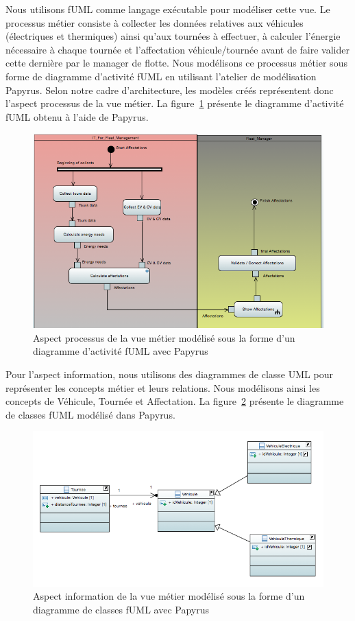 Nous utilisons fUML comme langage
exécutable pour modéliser cette vue. Le processus métier consiste à collecter
les données relatives aux véhicules (électriques et thermiques) ainsi qu'aux
tournées à effectuer, à calculer l'énergie nécessaire à chaque tournée et
l'affectation véhicule/tournée avant de faire valider cette dernière par le
manager de flotte. Nous modélisons ce processus métier sous forme de diagramme
d'activité fUML en utilisant l'atelier de modélisation Papyrus. Selon notre cadre
d'architecture, les modèles créés représentent donc l'aspect processus de la vue
métier. La figure~\ref{fig:processus_fuml} présente le diagramme d'activité fUML obtenu à
l'aide de Papyrus.

\begin{figure}[!htbp]
  \centering
  \includegraphics[width=1\textwidth]{figures/5_implementation/processus_fuml.png}
 \caption{Aspect processus de la vue métier modélisé sous la forme d'un diagramme d'activité fUML avec Papyrus}
 \label{fig:processus_fuml}
\end{figure}


Pour l'aspect information, nous utilisons des diagrammes de classe UML pour
représenter les concepts métier et leurs relations. Nous modélisons ainsi les
concepts de Véhicule, Tournée et Affectation. La figure~\ref{fig:information_metier}
présente le diagramme de classes fUML modélisé dans Papyrus.

\begin{figure}[!htbp]
  \centering
  \includegraphics[width=1\textwidth]{figures/5_implementation/information_metier.png}
 \caption{Aspect information de la vue métier modélisé sous la forme d'un diagramme de classes fUML avec Papyrus}
 \label{fig:information_metier}
\end{figure}

